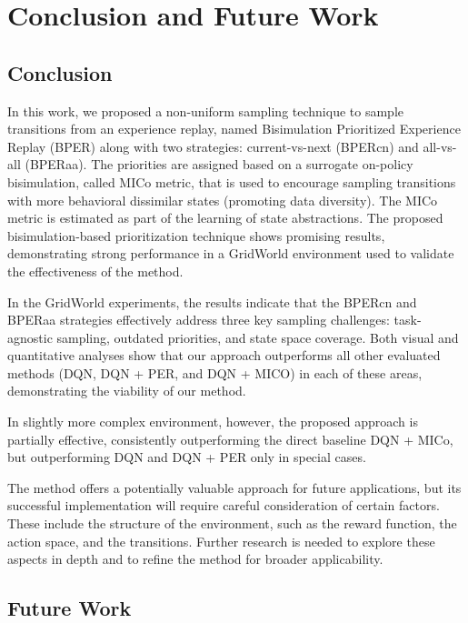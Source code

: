 
\chapter{Conclusion and Future Work}

\section{Conclusion}
In this work, we proposed a non-uniform sampling technique to sample transitions from an experience replay, named Bisimulation Prioritized Experience Replay (BPER) along with two strategies: current-vs-next (BPERcn) and all-vs-all (BPERaa). The priorities are assigned based on a surrogate on-policy bisimulation, called MICo metric, that is used to encourage sampling transitions with more behavioral dissimilar states (promoting data diversity). The MICo metric is estimated as part of the learning of state abstractions. The proposed bisimulation-based prioritization technique shows promising results, demonstrating strong performance in a GridWorld environment used to validate the effectiveness of the method.

In the GridWorld experiments, the results indicate that the BPERcn and BPERaa strategies effectively address three key sampling challenges: task-agnostic sampling, outdated priorities, and state space coverage. Both visual and quantitative analyses show that our approach outperforms all other evaluated methods (DQN, DQN + PER, and DQN + MICO) in each of these areas, demonstrating the viability of our method.

In slightly more complex environment, however, the proposed approach is partially effective, consistently outperforming the direct baseline DQN + MICo, but outperforming DQN and DQN + PER only in special cases.

The method offers a potentially valuable approach for future applications, but its successful implementation will require careful consideration of certain factors. These include the structure of the environment, such as the reward function, the action space, and the transitions. Further research is needed to explore these aspects in depth and to refine the method for broader applicability.

\section{Future Work}

